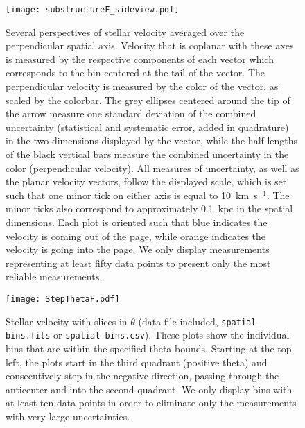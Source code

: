 \documentclass[11pt,preprint]{aastex6}
\begin{document}
\begin{figure}
\centering
\texttt{[image: substructureF\_sideview.pdf]}
\caption{
	Several perspectives of stellar velocity averaged over the perpendicular spatial axis.
	Velocity that is coplanar with these axes is measured by the respective components of each vector which corresponds to the bin centered at the tail of the vector.
	The perpendicular velocity is measured by the color of the vector, as scaled by the colorbar.
	The grey ellipses centered around the tip of the arrow measure one standard deviation of the combined uncertainty (statistical and systematic error, added in quadrature) in the two dimensions displayed by the vector, while the half lengths of the black vertical bars measure the combined uncertainty in the color (perpendicular velocity).
	All measures of uncertainty, as well as the planar velocity vectors, follow the displayed scale, which is set such that one minor tick on either axis is equal to 10~km~s$^{-1}$.
	The minor ticks also correspond to approximately 0.1~kpc in the spatial dimensions.
	Each plot is oriented such that blue indicates the velocity is coming out of the page, while orange indicates the velocity is going into the page.
	We only display measurements representing at least fifty data points to present only the most reliable measurements.
	\label{fig:vel_sideview}
}
\end{figure}

\begin{figure}
\centering
\texttt{[image: StepThetaF.pdf]}
\caption{
	Stellar velocity with slices in $\theta$ (data file included, \texttt{spatial-bins.fits} or \texttt{spatial-bins.csv}).
	These plots show the individual bins that are within the specified theta bounds.
	Starting at the top left, the plots start in the third quadrant (positive theta) and consecutively step in the negative direction, passing through the anticenter and into the second quadrant.
	We only display bins with at least ten data points in order to eliminate only the measurements with very large uncertainties.
	\label{fig:step_theta}
}
\end{figure}
\end{document}
